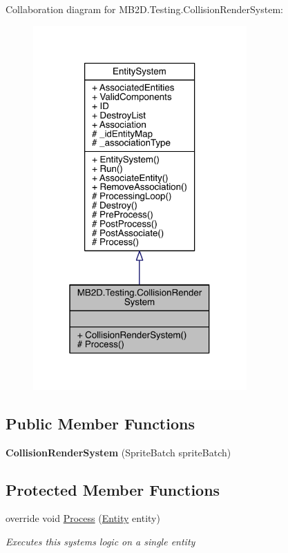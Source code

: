 Collaboration diagram for M\+B2\+D.\+Testing.\+Collision\+Render\+System\+:
\nopagebreak
\begin{figure}[H]
\begin{center}
\leavevmode
\includegraphics[width=232pt]{class_m_b2_d_1_1_testing_1_1_collision_render_system__coll__graph}
\end{center}
\end{figure}
\subsection*{Public Member Functions}
\begin{DoxyCompactItemize}
\item 
\hypertarget{class_m_b2_d_1_1_testing_1_1_collision_render_system_a6fc7755e518e6138a5b02f5af7d7e460}{}\label{class_m_b2_d_1_1_testing_1_1_collision_render_system_a6fc7755e518e6138a5b02f5af7d7e460} 
{\bfseries Collision\+Render\+System} (Sprite\+Batch sprite\+Batch)
\end{DoxyCompactItemize}
\subsection*{Protected Member Functions}
\begin{DoxyCompactItemize}
\item 
override void \hyperlink{class_m_b2_d_1_1_testing_1_1_collision_render_system_af7b7ffdb316533a084e98cbea97a096f}{Process} (\hyperlink{class_m_b2_d_1_1_entity_component_1_1_entity}{Entity} entity)
\begin{DoxyCompactList}\small\item\em Executes this systems logic on a single entity \end{DoxyCompactList}\end{DoxyCompactItemize}
